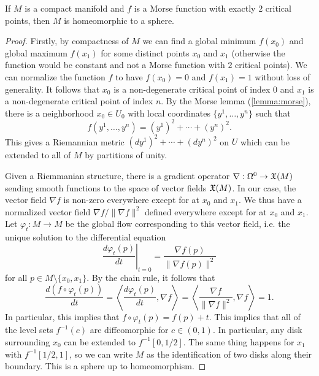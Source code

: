 \begin{theorem}[Reeb]\label{thm:reeb}
	If $M$ is a compact manifold and $f$ is a Morse function with exactly $2$ critical points, then $M$ is homeomorphic to a sphere.
\end{theorem}
\begin{proof}
	Firstly, by compactness of $M$ we can find a global minimum $f(x_0)$ and global maximum $f(x_1)$ for some distinct points $x_0$ and $x_1$ (otherwise the function would be constant and not a Morse function with $2$ critical points). We can normalize the function $f$ to have $f(x_0)=0$ and $f(x_1)=1$ without loss of generality. It follows that $x_0$ is a non-degenerate critical point of index 0 and $x_1$ is a non-degenerate critical point of index $n$.
	By the Morse lemma (\ref{lemma:morse}), there is a neighborhood $x_0\in U_0$ with local coordinates $\{y^1,\ldots, y^n\}$ such that
	\begin{equation}
		f(y^1,\ldots, y^n) = (y^1)^2 + \cdots + (y^n)^2.
	\end{equation}
	This gives a Riemannian metric $(dy^1)^2+\cdots+(dy^n)^2$ on $U$ which can be extended to all of $M$ by partitions of unity.

	Given a Riemmanian structure, there is a gradient operator $\nabla : \Omega^0 \to \operatorname{\mathfrak{X}}(M)$ sending smooth functions to the space of vector fields $\operatorname{\mathfrak{X}}(M)$.
	In our case, the vector field $\nabla f$ is non-zero everywhere except for at $x_0$ and $x_1$. We thus have a normalized vector field $\nabla f/\|\nabla f\|^2$
	defined everywhere except for at $x_0$ and $x_1$. Let $\varphi_t : M \to M$ be the global flow corresponding to this vector field, i.e. the unique solution to the differential equation
	\begin{equation}
		\left.\frac{d\varphi_t(p)}{dt}\right|_{t=0} = \frac{\nabla f(p)}{\|\nabla f(p)\|^2}
	\end{equation}
	for all $p\in M\setminus \{x_0,x_1\}$. By the chain rule, it follows that
	\begin{equation}
		\frac{d(f\circ \varphi_t(p))}{dt}=\left\langle \frac{d\varphi_t(p)}{dt}, \nabla f\right\rangle = \left\langle \frac{\nabla f}{\|\nabla f\|^2}, \nabla f\right\rangle=1.
	\end{equation}
	In particular, this implies that $f\circ \varphi_t(p) = f(p)+t$. This implies that all of the level sets $f^{-1}(c)$ are diffeomorphic for $c\in (0,1)$. In particular, any disk surrounding $x_0$ can be extended to $f^{-1}[0,1/2]$. The same thing happens for $x_1$ with $f^{-1}[1/2,1]$, so we can write $M$ as the identification of two disks along their boundary. This is a sphere up to homeomorphism.
\end{proof}

